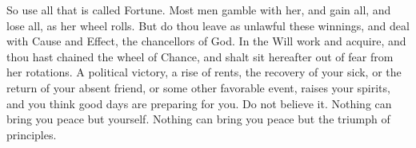 \documentclass[12pt]{article}
\begin{document}
So use all that is called Fortune. Most men gamble with her, and gain all,
and lose all, as her wheel rolls. But do thou leave as unlawful these
winnings, and deal with Cause and Effect, the chancellors of God. In the
Will work and acquire, and thou hast chained the wheel of Chance, and shalt
sit hereafter out of fear from her rotations. A political victory, a rise of
rents, the recovery of your sick, or the return of your absent friend, or
some other favorable event, raises your spirits, and you think good days are
preparing for you. Do not believe it. Nothing can bring you peace but
yourself. Nothing can bring you peace but the triumph of principles.
\label{theend}
\end{document}
